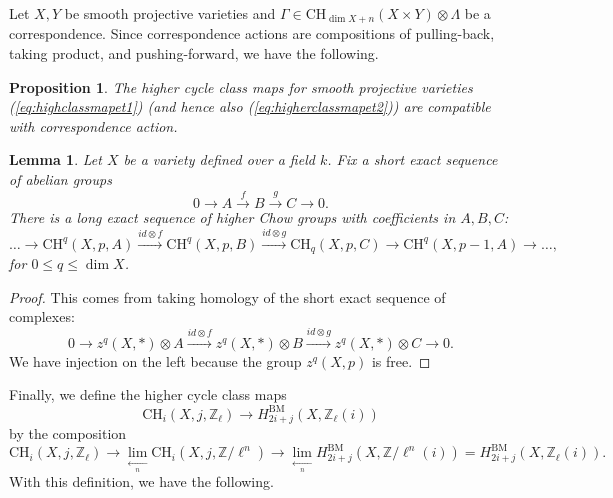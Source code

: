 \documentclass{amsart}
\newtheorem{lem}[theorem]{Lemma}
\newtheorem{prop}[theorem]{Proposition}
\theoremstyle{definition}
\theoremstyle{remark}
\newcommand{\mbb}{\mathbb}
\newcommand{\ZZ}{\mbb{Z}}
\begin{document}
Let $X, Y$ be smooth projective varieties and $\Gamma \in \text{CH}_{\dim X+n}(X\times Y)\otimes \Lambda$ be a correspondence.  Since correspondence actions are compositions of pulling-back, taking product, and pushing-forward, we have the following.

\begin{prop}\label{class_cor}
    The higher cycle class maps for smooth projective varieties (\ref{eq:highclassmapet1}) (and hence also (\ref{eq:higherclassmapet2})) are compatible with correspondence action.
\end{prop}

\begin{lem}\label{lem:modN}
    Let $X$ be a variety defined over a field $k$. Fix a short exact sequence of abelian groups
    \[
    0 \to A \xrightarrow{f} B \xrightarrow{g} C \to 0.
    \]
    There is a long exact sequence of higher Chow groups with coefficients in $A, B, C$: 
    \[
    \ldots \to \text{CH}^q(X, p, A) \xrightarrow{id\otimes f} \text{CH}^q(X, p, B) \xrightarrow{id \otimes g} \text{CH}_q(X, p, C) \to \text{CH}^q(X, p-1, A) \to\ldots,
    \]
    for $0 \leq q \leq \dim X$.
\end{lem}
\begin{proof}
    This comes from taking homology of the short exact sequence of complexes:
    \[
    0 \to z^{q}(X, *)\otimes A \xrightarrow{id \otimes f}z^{q}(X, *) \otimes B\xrightarrow{id \otimes g}z^{q}(X, *)\otimes C \to 0.
    \]
    We have injection on the left because the group $z^{q}(X, p)$ is free.
\end{proof}

Finally, we define the higher cycle class maps
\[
\text{CH}_i(X, j, \ZZ_\ell) \to H_{2i+j}^{\text{BM}}(X, \ZZ_\ell(i))
\]
by the composition
\[
\text{CH}_i(X, j, \ZZ_\ell) \to \lim \limits_{\xleftarrow[n]{}} \text{CH}_i(X, j, \ZZ/\ell^n) \to  \lim \limits_{\xleftarrow[n]{}}H_{2i+j}^{\text{BM}}(X, \ZZ/\ell^n(i)) = H_{2i+j}^{\text{BM}}(X, \ZZ_\ell(i)).
\]
With this definition, we have the following.
\end{document}
